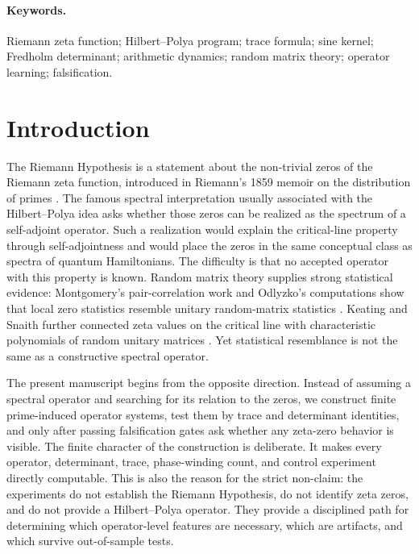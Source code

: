 \documentclass[11pt]{article}
\theoremstyle{definition}
\theoremstyle{plain}
\begin{document}
\paragraph{Keywords.} Riemann zeta function; Hilbert--Polya program; trace formula; sine kernel; Fredholm determinant; arithmetic dynamics; random matrix theory; operator learning; falsification.

\section{Introduction}

The Riemann Hypothesis is a statement about the non-trivial zeros of the Riemann zeta function, introduced in Riemann's 1859 memoir on the distribution of primes \citep{Riemann1859,Edwards1974,Titchmarsh1986}.  The famous spectral interpretation usually associated with the Hilbert--Polya idea asks whether those zeros can be realized as the spectrum of a self-adjoint operator.  Such a realization would explain the critical-line property through self-adjointness and would place the zeros in the same conceptual class as spectra of quantum Hamiltonians.  The difficulty is that no accepted operator with this property is known.  Random matrix theory supplies strong statistical evidence: Montgomery's pair-correlation work and Odlyzko's computations show that local zero statistics resemble unitary random-matrix statistics \citep{Montgomery1973,Odlyzko1987,Mehta2004}.  Keating and Snaith further connected zeta values on the critical line with characteristic polynomials of random unitary matrices \citep{KeatingSnaith2000}.  Yet statistical resemblance is not the same as a constructive spectral operator.

The present manuscript begins from the opposite direction.  Instead of assuming a spectral operator and searching for its relation to the zeros, we construct finite prime-induced operator systems, test them by trace and determinant identities, and only after passing falsification gates ask whether any zeta-zero behavior is visible.  The finite character of the construction is deliberate.  It makes every operator, determinant, trace, phase-winding count, and control experiment directly computable.  This is also the reason for the strict non-claim: the experiments do not establish the Riemann Hypothesis, do not identify zeta zeros, and do not provide a Hilbert--Polya operator.  They provide a disciplined path for determining which operator-level features are necessary, which are artifacts, and which survive out-of-sample tests.
\end{document}
